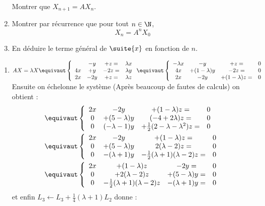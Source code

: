 \documentclass[a4paper, 11pt,reqno]{article}
\begin{document}
\begin{exercice}
\begin{enumerate}
Montrer que $X_{n+1} = A X_n$. 
\item Montrer par récurrence que pour tout $n\in \N$, $$X_n = A^n X_0$$
\item En déduire le terme général de $\suite{x}$ en fonction de $n$. 
\end{enumerate} 
\end{exercice}

\begin{correction}
\begin{enumerate}
\item $AX= \lambda X \equivaut \left\{ \begin{array}{cccc}
&-y&+z=&\lambda x\\
4x &+y&-2z=&\lambda y\\
2x &-2y&+z=&\lambda z
\end{array}
\right.\equivaut \left\{ \begin{array}{cccc}
-\lambda x&-y&+z=&0\\
4x &+(1-\lambda)y&-2z=&0\\
2x &-2y&+(1-\lambda) z=&0
\end{array}
\right.$  
Ensuite on échelonne le système (Après beaucoup de fautes de calculs) on obtient :
\begin{align*}
&\equivaut \left\{ \begin{array}{cccc}
2x &-2y&+(1-\lambda) z=&0\\
0 &+(5-\lambda)y&(-4+2\lambda) z=&0\\
0 &(-\lambda -1) y&+\frac{1}{2}(2-\lambda-\lambda^2) z=&0
\end{array}
\right.\\
&\equivaut \left\{ \begin{array}{cccc}
2x &-2y&+(1-\lambda) z=&0\\
0 &+(5-\lambda)y&2(\lambda-2) z=&0\\
0 &-(\lambda +1) y&-\frac{1}{2}(\lambda+1)(\lambda-2) z=&0
\end{array}
\right.\\
&\equivaut \left\{ \begin{array}{cccc}
2x &+(1-\lambda) z&-2y=&0\\
0 &+2(\lambda-2) z &+(5-\lambda)y=&0\\
0 &-\frac{1}{2}(\lambda+1)(\lambda-2) z&-(\lambda +1) y=&0
\end{array}
\right.
\end{align*}
et enfin $L_3\leftarrow L_3+\frac{1}{4}(\lambda+1) L_2$ donne : 


\end{enumerate}
\end{correction}
\end{document}
